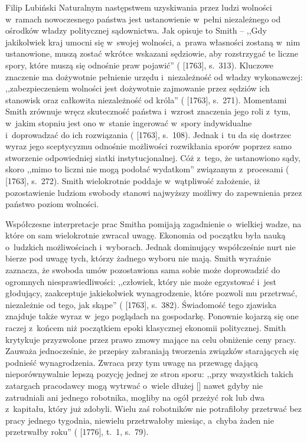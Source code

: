 \begin{artplenv}{Filip Lubiński}
Naturalnym następstwem uzyskiwania przez ludzi wolności w~ramach nowoczesnego państwa jest ustanowienie w~pełni
niezależnego od ośrodków władzy politycznej sądownictwa. Jak opisuje to Smith -- ,,Gdy jakikolwiek kraj umocni
się w~swojej wolności, a~prawa własności zostaną w~nim ustanowione, muszą zostać wkrótce wskazani sędziowie, aby rozstrzygać
te liczne spory, które muszą się odnośnie praw pojawić''
(\cite{smith_lectures_1982} [1763], s.~313).
Kluczowe
znaczenie ma dożywotnie pełnienie urzędu i~niezależność od władzy wykonawczej: ,,zabezpieczeniem wolności jest
dożywotnie zajmowanie przez sędziów ich stanowisk oraz całkowita niezależność od króla''
(\cite{smith_lectures_1982} [1763], s.~271).
Momentami Smith zrównuje wręcz skuteczność państwa i~wzrost
znaczenia jego roli z~tym, w~jakim stopniu jest ono w~stanie ingerować w~spory indywidualne i~doprowadzać do ich
rozwiązania
(\cite{smith_lectures_1982} [1763], s.~108).
Jednak i~tu da się dostrzec wyraz jego sceptycyzmu
odnośnie możliwości rozwikłania sporów poprzez samo stworzenie odpowiedniej siatki instytucjonalnej. Cóż z~tego, że
ustanowiono sądy, skoro ,,mimo to liczni nie mogą podołać wydatkom'' związanym z~procesami
(\cite{smith_lectures_1982} [1763], s.~272).
Smith wielokrotnie poddaje w~wątpliwość założenie, iż
pozostawienie ludziom swobody stanowi najwyższy możliwy do zapewnienia przez państwo poziom wolności.

Współczesne interpretacje prac Smitha pomijają zagadnienie o~wielkiej wadze, na które on sam wielokrotnie zwracał
uwagę. Ekonomia od początku była nauką o~ludzkich możliwościach i~wyborach. Jednak dominujący współcześnie nurt nie
bierze pod uwagę tych, którzy żadnego wyboru nie mają. Smith wyraźnie zaznacza, że swoboda umów pozostawiona sama sobie
może doprowadzić do ogromnych niesprawiedliwości: ,,człowiek, który nie może egzystować i~jest głodujący, zaakceptuje
jakiekolwiek wynagrodzenie, które pozwoli mu przetrwać, niezależnie od tego, jak skąpe''
(\cite{smith_lectures_1982} [1763], s.~382).
Świadomość tego zjawiska znajduje także wyraz w~jego poglądach na gospodarkę. Ponownie kojarzą
się one raczej z~końcem niż początkiem epoki klasycznej ekonomii politycznej. Smith krytykuje przyzwolone przez prawo
zmowy mające na celu obniżenie ceny pracy. Zauważa jednocześnie, że przepisy zabraniają tworzenia związków starających
się podnieść wynagrodzenia. Zwraca przy tym uwagę na przewagę dającą nieporównywalnie lepszą pozycję jednej ze stron
sporu: ,,przy wszystkich takich zatargach pracodawcy mogą wytrwać o~wiele dłużej [\mydots] nawet gdyby nie zatrudniali ani
jednego robotnika, mogliby na ogół przeżyć rok lub dwa z~kapitału, który już zdobyli. Wielu zaś robotników nie
potrafiłoby przetrwać bez pracy jednego tygodnia, niewielu przetrwałoby miesiąc, a~chyba żaden nie przetrwałby roku''
(\cite{smith_badania_2007} [1776], t.~1, s.~79).


\end{artplenv}
